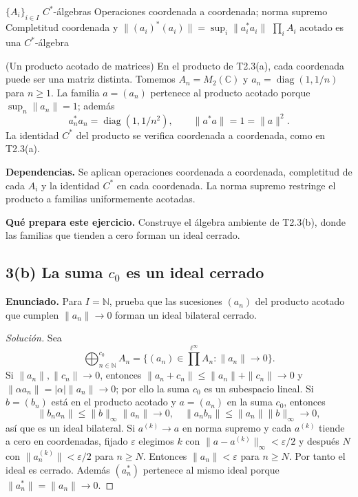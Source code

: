 \proofdiagram
{$\{A_i\}_{i\in I}$ $C^*$-álgebras}
{Operaciones coordenada a coordenada; norma supremo}
{Completitud coordenada y $\|(a_i)^*(a_i)\|=\sup_i\|a_i^*a_i\|$}
{$\prod_i A_i$ acotado es una $C^*$-álgebra}

\begin{cthejemplo}{(Un producto acotado de matrices)}
En el producto de T2.3(a), cada coordenada puede ser una matriz distinta.
Tomemos $A_n=M_2(\mathbb C)$ y $a_n=\operatorname{diag}(1,1/n)$ para $n\ge1$.
La familia $a=(a_n)$ pertenece al producto acotado porque $\sup_n\|a_n\|=1$; además
\[
 a_n^*a_n=\operatorname{diag}(1,1/n^2),
 \qquad \|a^*a\|=1=\|a\|^2.
\]
La identidad $C^*$ del producto se verifica coordenada a coordenada, como en T2.3(a).
\end{cthejemplo}

\noindent\textbf{Dependencias.} Se aplican operaciones coordenada a coordenada, completitud de cada $A_i$ y la identidad $C^*$ en cada coordenada. La norma supremo restringe el producto a familias uniformemente acotadas.

\noindent\textbf{Qué prepara este ejercicio.} Construye el álgebra ambiente de T2.3(b), donde las familias que tienden a cero forman un ideal cerrado.

\subsection*{3(b) La suma $c_0$ es un ideal cerrado}

\noindent\textbf{Enunciado.} Para $I=\mathbb N$, prueba que las sucesiones $(a_n)$ del producto acotado que cumplen $\|a_n\|\to0$ forman un ideal bilateral cerrado.

\begin{proof}[Solución]
Sea
\[
\bigoplus_{n\in\mathbb N}^{c_0}A_n
=\{(a_n)\in\prod^{\ell^\infty}A_n:\|a_n\|\to0\}.
\]
Si $\|a_n\|,\|c_n\|\to0$, entonces
$\|a_n+c_n\|\le\|a_n\|+\|c_n\|\to0$ y
$\|\alpha a_n\|=|\alpha|\|a_n\|\to0$; por ello la suma $c_0$ es un subespacio lineal.
Si $b=(b_n)$ está en el producto acotado y $a=(a_n)$ en la suma $c_0$, entonces
\[
\|b_na_n\|\le\|b\|_\infty\|a_n\|\to0,
\quad
\|a_nb_n\|\le\|a_n\|\|b\|_\infty\to0,
\]
así que es un ideal bilateral. Si $a^{(k)}\to a$ en norma supremo y cada $a^{(k)}$ tiende a cero en
coordenadas, fijado $\varepsilon$ elegimos $k$ con
$\|a-a^{(k)}\|_\infty<\varepsilon/2$ y después $N$ con
$\|a_n^{(k)}\|<\varepsilon/2$ para $n\ge N$. Entonces $\|a_n\|<\varepsilon$ para $n\ge N$.
Por tanto el ideal es cerrado.
Además $(a_n^*)$ pertenece al mismo ideal porque $\|a_n^*\|=\|a_n\|\to0$.
\end{proof}

